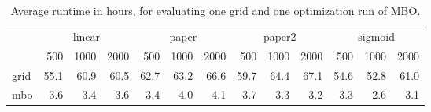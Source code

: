 \begin{table}

\caption{\label{tab:table_time}Average runtime in hours, for evaluating one grid and one optimization run of MBO.}
\centering
\begin{tabular}[t]{lrrrrrrrrrrrr}
\toprule
\multicolumn{1}{c}{ } & \multicolumn{3}{c}{linear} & \multicolumn{3}{c}{paper} & \multicolumn{3}{c}{paper2} & \multicolumn{3}{c}{sigmoid} \\
\cmidrule(l{3pt}r{3pt}){2-4} \cmidrule(l{3pt}r{3pt}){5-7} \cmidrule(l{3pt}r{3pt}){8-10} \cmidrule(l{3pt}r{3pt}){11-13}
 & 500 & 1000 & 2000 & 500 & 1000 & 2000 & 500 & 1000 & 2000 & 500 & 1000 & 2000\\
\midrule
grid & 55.1 & 60.9 & 60.5 & 62.7 & 63.2 & 66.6 & 59.7 & 64.4 & 67.1 & 54.6 & 52.8 & 61.0\\
mbo & 3.6 & 3.4 & 3.6 & 3.4 & 4.0 & 4.1 & 3.7 & 3.3 & 3.2 & 3.3 & 2.6 & 3.1\\
\bottomrule
\end{tabular}
\end{table}
